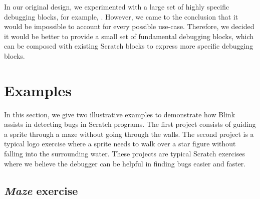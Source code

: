 \documentclass[../main]{subfiles}
\begin{document}
In our original design, we experimented with a large set of highly specific debugging blocks, for example, .
However, we came to the conclusion that it would be impossible to account for every possible use-case.
Therefore, we decided it would be better to provide a small set of fundamental debugging blocks, which can be composed with existing Scratch blocks to express more specific debugging blocks.

\section{Examples}\label{sec:blink-illustrative-examples}

In this section, we give two illustrative examples to demonstrate how Blink assists in detecting bugs in Scratch programs.
The first project consists of guiding a sprite through a maze without going through the walls.
The second project is a typical logo exercise where a sprite needs to walk over a star figure without falling into the surrounding water.
These projects are typical Scratch exercises where we believe the debugger can be helpful in finding bugs easier and faster.

\subsection{\emph{Maze} exercise}\label{subsec:maze-exercise}
\end{document}
